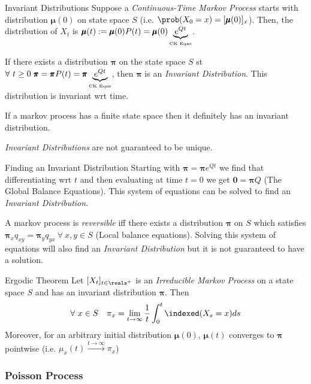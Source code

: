 \documentclass[11pt,a4paper]{article}
\begin{document}
\begin{definition}{Invariant Distributions}
  Suppose a \textit{Continuous-Time Markov Process} starts with distribution $\pmb\mu(0)$ on state space $S$ (i.e. $\prob(X_0=x)=[\pmb\mu(0)]_x$). Then, the distribution of $X_t$ is $\pmb\mu(t):=\pmb\mu(0)P(t)=\pmb\mu(0)\underbrace{e^{Qt}}_\text{\tiny CK Eqns}$.
  \par If there exists a distribution $\pmb\pi$ on the state space $S$ st $\forall\ t\geq0\ \pmb\pi=\pmb\pi P(t)=\pmb\pi \underbrace{e^{Qt}}_\text{\tiny CK Eqns}$, then $\pmb\pi$ is an \textit{Invariant Distribution}. This distribution is invariant wrt time.
  \par If a markov process has a finite state space then it definitely has an invariant distribution.
  \par \textit{Invariant Distributions} are not guaranteed to be unique.
\end{definition}

\begin{proposition}{Finding an Invariant Distribution}
  Starting with $\pmb\pi=\pmb\pi e^{Qt}$ we find that differentiating wrt $t$ and then evaluating at time $t=0$ we get $\pmb0=\pmb\pi Q$ (The Global Balance Equations). This system of equations can be solved to find an \textit{Invariant Distribution}.
  \par A markov process is \textit{reversible} iff there exists a distribution $\pmb\pi$ on $S$ which satisfies $\pmb\pi_xq_{xy}=\pmb\pi_yq_{yx}\ \forall\ x,y\in S$ (Local balance equations). Solving this system of equations will also find an \textit{Invariant Distribution} but it is not guaranteed to have a solution.
\end{proposition}

\begin{theorem}{Ergodic Theorem}
  Let $[X_t]_{t\in\reals^+}$ is an \textit{Irreducible Markov Process} on a state space $S$ and has an invariant distribution $\pmb\pi$. Then
  \[ \forall\ x\in S\quad\pi_x=\lim_{t\to\infty}\frac1t\int_0^t\indexed(X_s=x)ds \]
  Moreover, for an arbitrary initial distribution $\pmb\mu(0)$, $\pmb\mu(t)$ converges to $\pmb\pi$ pointwise (i.e. $\mu_x(t)\overset{t\to\infty}\longrightarrow\pi_x$)
\end{theorem}

\subsubsection{Poisson Process}
\end{document}
